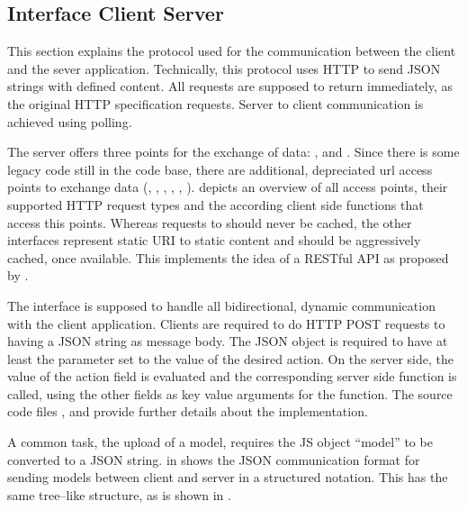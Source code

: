 \subsection{Interface Client Server}
\label{sec:iface_c_s}

This section explains the protocol used for the communication between the client and the sever application.
Technically, this protocol uses HTTP to send JSON strings with defined content.
All requests are supposed to return immediately, as the original HTTP specification requests.
Server to client communication is achieved using polling.

The server offers three points for the exchange of data: ,  and .
Since there is some legacy code still in the code base, there are additional, depreciated url access points to exchange data (, , , , , ).
 depicts an overview of all access points, their supported HTTP request types and the according client side functions that access this points.
Whereas requests to  should never be cached, the other interfaces represent static URI to static content and should be aggressively cached, once available. This implements the idea of a RESTful API as proposed by \cite{Fielding:2002:PDM:514183.514185}.




The interface  is supposed to handle all bidirectional, dynamic communication with the client application.
Clients are required to do HTTP POST requests to \splurl[api] having a JSON string as message body.
The JSON object is required to have at least the parameter  set to the value of the desired action.
On the server side, the value of the action field is evaluated and the corresponding server side function is called, using the other fields as key value arguments for the function.
The source code files ,  and  provide further details about the implementation.

A common task, the upload of a model, requires the JS object ``model'' to be converted to a JSON string.
 in  shows the JSON communication format for sending models between client and server in a structured notation.
This has the same tree--like structure, as is shown in .


